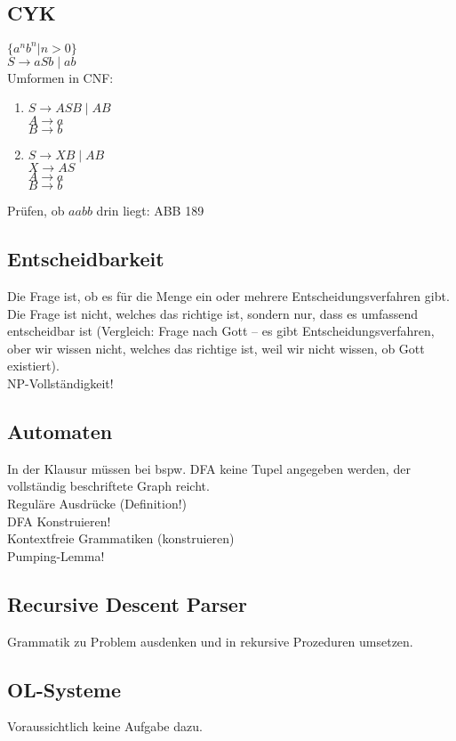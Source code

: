 \subsection{CYK}
$\{a^nb^n|n>0\}$\\
$S\to aSb \;|\; ab$\\
Umformen in CNF:
\begin{enumerate}
\item $S\to ASB \;|\; AB$\\
$A\to a$\\
$B\to b$
\item $S\to XB \;|\; AB$\\
$X\to AS$\\
$A \to a$\\
$B \to b$
\end{enumerate}
Prüfen, ob $aabb$ drin liegt:
ABB 189
\subsection{Entscheidbarkeit}
Die Frage ist, ob es für die Menge ein oder mehrere Entscheidungsverfahren gibt. Die Frage ist nicht, welches das richtige ist, sondern nur, dass es umfassend entscheidbar ist (Vergleich: Frage nach Gott -- es gibt Entscheidungsverfahren, ober wir wissen nicht, welches das richtige ist, weil wir nicht wissen, ob Gott existiert).\\
NP-Vollständigkeit!

\subsection{Automaten}
In der Klausur müssen bei bspw. DFA keine Tupel angegeben werden, der vollständig beschriftete Graph reicht.\\
Reguläre Ausdrücke (Definition!)\\
DFA Konstruieren!\\
Kontextfreie Grammatiken (konstruieren)\\
Pumping-Lemma!

\subsection{Recursive Descent Parser}
Grammatik zu Problem ausdenken und in rekursive Prozeduren umsetzen.

\subsection{OL-Systeme}
Voraussichtlich keine Aufgabe dazu.
\newpage
\printbibliography

